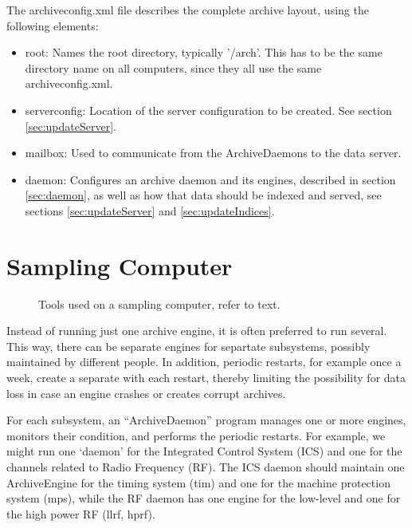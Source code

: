 

\noindent The archiveconfig.xml file describes the complete archive layout,
using the following elements:
\begin{itemize}
\item root: Names the root directory, typically '/arch'.
      This has to be the same directory name on all computers,
      since they all use the same archiveconfig.xml.
\item serverconfig: Location of the server configuration to be
      created. See section \ref{sec:updateServer}.
\item mailbox: Used to communicate from the ArchiveDaemons to
      the data server.
\item daemon: Configures an archive daemon and its engines,
      described in section \ref{sec:daemon},
      as well as how that data should be indexed and served,
      see sections \ref{sec:updateServer} and \ref{sec:updateIndices}.
\end{itemize}

\section{Sampling Computer}
\begin{figure}[htb]
\begin{center}
\end{center}
\caption{\label{fig:acSample}Tools used on a sampling computer, refer to text.}
\end{figure}

\noindent Instead of running just one archive engine, it is often preferred to
run several. This way, there can be separate engines for separtate
subsystems, possibly maintained by different people.  In addition,
periodic restarts, for example once a week, create a separate
 with each restart, thereby limiting the
possibility for data loss in case an engine crashes or creates corrupt archives.

For each subsystem, an ``ArchiveDaemon'' program manages one or more
engines, monitors their condition, and performs the periodic restarts.
For example, we might run one `daemon' for the Integrated Control
System (ICS) and one for the channels related to Radio Frequency (RF).
The ICS daemon should maintain one ArchiveEngine for the timing system
(tim) and one for the machine protection system (mps), while the RF
daemon has one engine for the low-level and one for the high power RF
(llrf, hprf).

